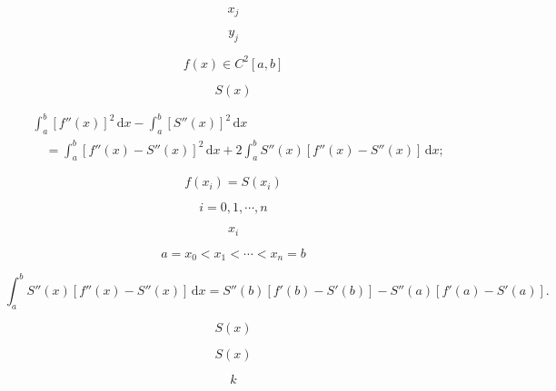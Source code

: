 \documentclass[fontset=fandol]{ctexart}
\begin{document}
\[x_j\]

\[y_j\]

\[f(x)\in C^2[a,b]\]

\[S(x)\]

\[\begin{aligned}
&\int_a^b[f''(x)]^2\,\mathrm dx-\int_a^b[S''(x)]^2\,\mathrm dx\\
&\quad=\int_a^b[f''(x)-S''(x)]^2\,\mathrm dx+2\int_a^b S''(x)[f''(x)-S''(x)]\,\mathrm dx;
\end{aligned}\]

\[f(x_i)=S(x_i)\]

\[i=0,1,\cdots,n\]

\[x_i\]

\[a=x_0<x_1<\cdots<x_n=b\]

\[\int_a^b S''(x)[f''(x)-S''(x)]\,\mathrm dx=S''(b)[f'(b)-S'(b)]-S''(a)[f'(a)-S'(a)].\]

\[S(x)\]

\[S(x)\]

\[k\]
\end{document}
